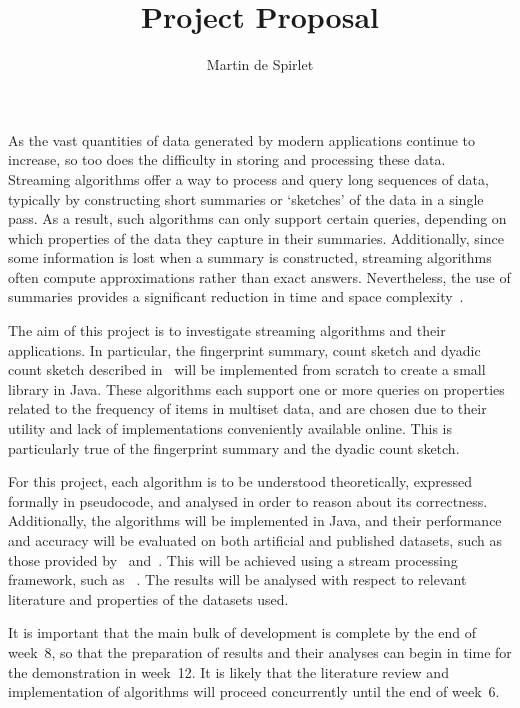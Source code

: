 \documentclass[
  11pt,
  a4paper,
]{article}
\title{Project Proposal}
\author{Martin de Spirlet}
\date{}
\begin{document}
\maketitle

As the vast quantities of data generated by modern applications continue to increase, so too does the difficulty in storing and processing these data.
Streaming algorithms offer a way to process and query long sequences of data, typically by constructing short summaries or `sketches' of the data in a single pass.
As a result, such algorithms can only support certain queries, depending on which properties of the data they capture in their summaries.
Additionally, since some information is lost when a summary is constructed, streaming algorithms often compute approximations rather than exact answers.
Nevertheless, the use of summaries provides a significant reduction in time and space complexity~\citep{cormode20}.

The aim of this project is to investigate streaming algorithms and their applications.
In particular, the fingerprint summary, count sketch and dyadic count sketch described in~\cite{cormode20} will be implemented from scratch to create a small library in Java.
These algorithms each support one or more queries on properties related to the frequency of items in multiset data, and are chosen due to their utility and lack of implementations conveniently available online.
This is particularly true of the fingerprint summary and the dyadic count sketch.

For this project, each algorithm is to be understood theoretically, expressed formally in pseudocode, and analysed in order to reason about its correctness.
Additionally, the algorithms will be implemented in Java, and their performance and accuracy will be evaluated on both artificial and published datasets, such as those provided by~\cite{dua18} and~\cite{demaine14}.
This will be achieved using a stream processing framework, such as ~\citep{tasf14}.
The results will be analysed with respect to relevant literature and properties of the datasets used.

It is important that the main bulk of development is complete by the end of week~8, so that the preparation of results and their analyses can begin in time for the demonstration in week~12.
It is likely that the literature review and implementation of algorithms will proceed concurrently until the end of week~6.


\end{document}
